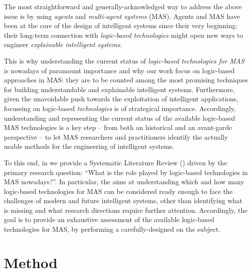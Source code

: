 \documentclass[12pt,a4paper,openright,twoside]{book}
\begin{document}
The most straightforward and generally-acknowledged way to address the above issue is by using \emph{agents} and \emph{multi-agent systems} (MAS).
%
Agents and MAS have been at the core of the design of intelligent systems since their very beginning:  their long-term connection with \emph{logic-based technologies} might open new ways to engineer \emph{explainable intelligent systems}.

This is why understanding the current status of \emph{logic-based technologies for MAS} is nowadays of paramount importance and why our work focus on logic-based approaches in MAS: they are to be counted among the most promising techniques for building understandable and explainable intelligent systems.
%
Furthermore, given the unavoidable push towards the exploitation of intelligent applications, focussing on logic-based \emph{technologies} is of strategical importance.
%
Accordingly, understanding and representing the current status of the available logic-based MAS technologies is a key step -- from both an historical and an avant-garde perspective -- to let MAS researchers and practitioners identify the actually usable methods for the engineering of intelligent systems.

To this end, in \cite{lptech4mas-jaamas35} we provide a Systematic Literature Review (\slr{}) driven by the primary research question: ``What is the role played by logic-based technologies in MAS nowadays?''.
%
In particular, the \slr{} aims at understanding which and how many logic-based technologies for MAS can be considered ready enough to face the challenges of modern and future intelligent systems, other than identifying what is missing and what research directions require further attention.
%
Accordingly, the goal is to provide an exhaustive assessment of the available logic-based technologies for MAS, by performing a carefully-designed \slr{} on the subject.

\section{Method}
\end{document}
